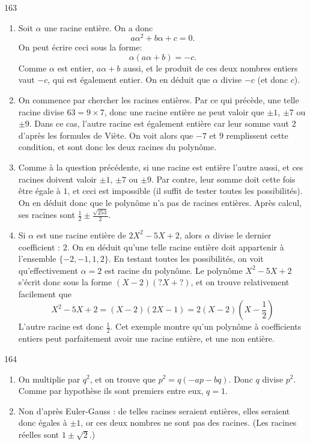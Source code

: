 \begin{Soln}{163}
\begin{enumerate}
\item Soit $\alpha$ une racine entière. On a donc
\[a\alpha^2+b\alpha+c=0.\]
On peut écrire ceci sous la forme:
\[\alpha(a\alpha+b)=-c.\]
Comme $\alpha$ est entier, $a\alpha+b$ aussi, et le produit de ces deux nombres entiers vaut $-c$, qui est également entier. On en déduit que $\alpha$ divise $-c$ (et donc $c$).


\item On commence par chercher les racines entières. Par ce qui précède, une telle racine divise $63 = 9\times 7$, donc une racine entière ne peut valoir que $\pm 1$, $\pm 7$ ou $\pm 9$. Dans ce cas, l'autre racine est également entière car leur somme vaut $2$ d'après les formules de Viète. On voit alors que $-7$ et $9$ remplissent cette condition, et sont donc les deux racines du polynôme.
\item Comme à la question précédente, si une racine est entière l'autre aussi, et ces racines doivent valoir $\pm 1$, $\pm 7$ ou $\pm 9$. Par contre, leur somme doit cette fois être égale à $1$, et ceci est impossible (il suffit de tester toutes les possibilités). On en déduit donc que le polynôme n'a pas de racines entières. Après calcul, ses racines sont $\frac12 \pm \frac{\sqrt{253}}{2}$.
\item Si $\alpha$ est une racine entière de $2X^2-5X+2$, alors $\alpha$ divise le dernier coefficient : $2$. On en déduit qu'une telle racine entière doit appartenir à l'ensemble $\{-2,-1,1,2\}$. En testant toutes les possibilités, on voit qu'effectivement $\alpha=2$ est racine du polynôme. Le polynôme $X^2-5X+2$ s'écrit donc sous la forme $(X-2)(?X+?)$, et on trouve relativement facilement que
\[
X^2-5X+2 = (X-2)(2X-1) = 2(X-2)(X-\frac{1}{2})\]
L'autre racine est donc $\frac12$. Cet exemple montre qu'un polynôme à coefficients entiers peut parfaitement avoir une racine entière, et une non entière.
\end{enumerate}
\end{Soln}
\begin{Soln}{164}
\begin{enumerate}
\item On multiplie par $q^2$, et on trouve que $p^2=q(-ap-bq)$. Donc $q$ divise $p^2$. Comme par hypothèse ils sont premiers entre eux, $q=1$.
\item Non d'après Euler-Gauss : de telles racines seraient entières, elles seraient donc égales à $\pm 1$, or ces deux nombres ne sont pas des racines. (Les racines réelles sont $1\pm \sqrt 2$.)
\end{enumerate}
\end{Soln}

